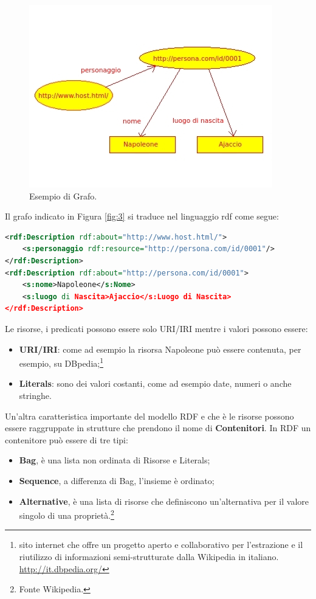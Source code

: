 \documentclass[a4paper,11pt]{article}
\begin{document}
\begin{figure}[ht]
	\centering
	\includegraphics[scale=1]{Napoleone.jpeg}
	\caption{Esempio di Grafo.}
	\label{fig:4}
\end{figure}
Il grafo indicato in Figura \ref{fig:3} si traduce nel linguaggio rdf come segue:
\begin{lstlisting}[language=XML, basicstyle=\large]
<rdf:Description rdf:about="http://www.host.html/">
	<s:personaggio rdf:resource="http://persona.com/id/0001"/>
</rdf:Description>
<rdf:Description rdf:about="http://persona.com/id/0001">
 	<s:nome>Napoleone</s:Nome>
 	<s:luogo di Nascita>Ajaccio</s:Luogo di Nascita>
</rdf:Description>

\end{lstlisting}
\newpage
Le risorse, i predicati possono essere solo URI/IRI mentre i valori possono essere:
\begin{itemize}
	\item \textbf{URI/IRI}: come ad esempio la risorsa Napoleone può essere contenuta, per esempio, su DBpedia;\footnote{ sito internet che offre un progetto aperto e collaborativo per l’estrazione e il riutilizzo di informazioni semi-strutturate dalla Wikipedia in italiano. \url{http://it.dbpedia.org/}}
	\item \textbf{Literals}: sono dei valori costanti, come ad esempio date, numeri o anche stringhe.
\end{itemize}
Un'altra caratteristica importante del modello RDF e che è le risorse possono essere raggruppate in strutture che prendono il nome di \textbf{Contenitori}. In RDF un contenitore può essere di tre tipi:
\begin{itemize}
	\item \textbf{Bag}, è una lista non ordinata di Risorse e Literals;
	\item \textbf{Sequence}, a differenza di Bag, l'insieme è ordinato;
	\item \textbf{Alternative}, è una lista di risorse che definiscono un'alternativa per il valore singolo di una proprietà.\footnote{Fonte Wikipedia.}
\end{itemize} 
\end{document}
